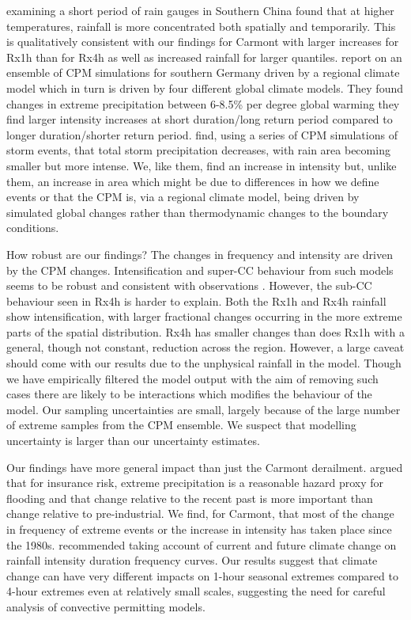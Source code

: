 \documentclass[11pt,a4paper]{article}
\begin{document}
 \cite{long2021rainfall_conc} examining a short period of rain gauges in Southern China found that at higher temperatures, rainfall is more concentrated both spatially and temporarily. This is qualitatively consistent with our findings for Carmont with larger increases for Rx1h than for Rx4h as well as increased rainfall for larger quantiles. \cite{hundhausen2024extreme_precip} report on an ensemble of CPM simulations for southern Germany driven by a regional climate model which in turn is driven by four different global climate models. They found changes in extreme precipitation between 6-8.5\% per degree global warming  they find larger intensity increases at short duration/long return period compared to longer duration/shorter return period. \cite{Moshe2022extremes} find, using a series of CPM simulations  of storm events, that total storm precipitation decreases, with rain area becoming smaller but more intense. We, like them, find an increase in intensity but, unlike them, an increase in area which might be due to differences in how we define events or that the CPM is, via a regional climate model, being driven by simulated global changes rather than thermodynamic changes to the boundary conditions. 


How robust are our findings? The changes in frequency and intensity are  driven by the CPM changes. Intensification and super-CC behaviour from such models seems to be robust and consistent with observations \parencite{fowler2021rainfall_extremes}. However, the sub-CC behaviour seen in Rx4h is harder to explain.  Both the Rx1h and Rx4h rainfall show intensification, with larger fractional changes occurring in the more extreme parts of the spatial distribution. Rx4h has smaller changes than does Rx1h with a general, though not constant, reduction across the region.   However, a large caveat should come with our results due to the unphysical rainfall in the model. Though we have empirically filtered the model output with the aim of removing such cases there are likely to be interactions which modifies the behaviour of the model. Our sampling uncertainties are small, largely because of the large number of extreme samples from the CPM ensemble. We suspect that modelling uncertainty is larger than our uncertainty estimates. 

Our findings have more general impact than just the Carmont derailment. \cite{lang2024catmodels} argued that  for insurance risk, extreme precipitation is a reasonable hazard proxy for flooding and  that change relative to the recent past is more important than change relative to pre-industrial. We find, for Carmont, that most of the change in frequency of extreme events or the increase in intensity has taken place since the 1980s.  \cite{martel2021rainfall_ifd} recommended taking account of current and future climate change on rainfall intensity duration frequency curves. Our results suggest that climate change can have very different impacts on 1-hour seasonal extremes compared to 4-hour extremes even at relatively small scales, suggesting the need for careful analysis of convective permitting models. 
\end{document}
